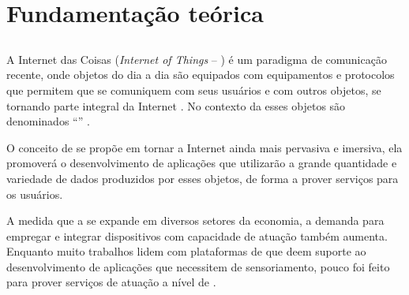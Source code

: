 \chapter{Fundamentação teórica}

\section{\iot}

A Internet das Coisas (\textit{Internet of Things} -- \iot) é um paradigma de comunicação recente, onde objetos do dia a dia são equipados com equipamentos e protocolos que permitem que se comuniquem com seus usuários e com outros objetos, se tornando parte integral da Internet \cite{Atzori:2010}. No contexto da \iot{} esses objetos são denominados ``\smartobj'' \cite{bandyopadhyay2011internet}.

O conceito de \iot{} se propõe em tornar a Internet ainda mais pervasiva e imersiva, ela promoverá o desenvolvimento de aplicações que utilizarão a grande quantidade e variedade de dados produzidos por esses objetos, de forma a prover serviços para os usuários. 

A medida que a \iot{} se expande em diversos setores da economia, a demanda para empregar e integrar dispositivos com capacidade de atuação também aumenta. Enquanto muito trabalhos lidem com plataformas de \middleware{} que deem suporte ao desenvolvimento de aplicações que necessitem de sensoriamento, pouco foi feito para prover serviços de atuação a nível de \middleware{} \cite{OJIOT_2018v4i1n03_Valim}.


